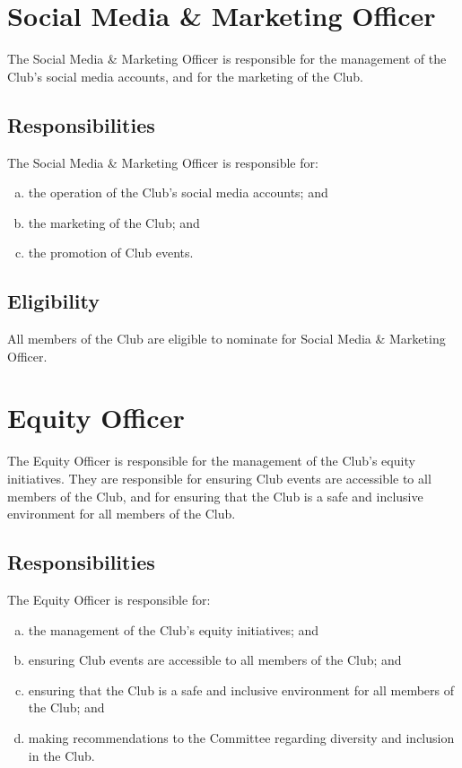 \documentclass[11pt]{report}
\begin{document}
\section{Social Media \& Marketing Officer}
The Social Media \& Marketing Officer is responsible for the management of the Club's social media accounts, and for the marketing of the Club.
\subsection{Responsibilities}
The Social Media \& Marketing Officer is responsible for:
\begin{enumerate}[(a)]
    \item the operation of the Club's social media accounts; and
    \item the marketing of the Club; and
    \item the promotion of Club events.
\end{enumerate}
\subsection{Eligibility}
All members of the Club are eligible to nominate for Social Media \& Marketing Officer.

\section{Equity Officer}
The Equity Officer is responsible for the management of the Club's equity initiatives. They are responsible for ensuring Club events are accessible to all members of the Club, and for ensuring that the Club is a safe and inclusive environment for all members of the Club.
\subsection{Responsibilities}
The Equity Officer is responsible for:
\begin{enumerate}[(a)]
    \item the management of the Club's equity initiatives; and
    \item ensuring Club events are accessible to all members of the Club; and
    \item ensuring that the Club is a safe and inclusive environment for all members of the Club; and
    \item making recommendations to the Committee regarding diversity and inclusion in the Club.
\end{enumerate}
\end{document}
